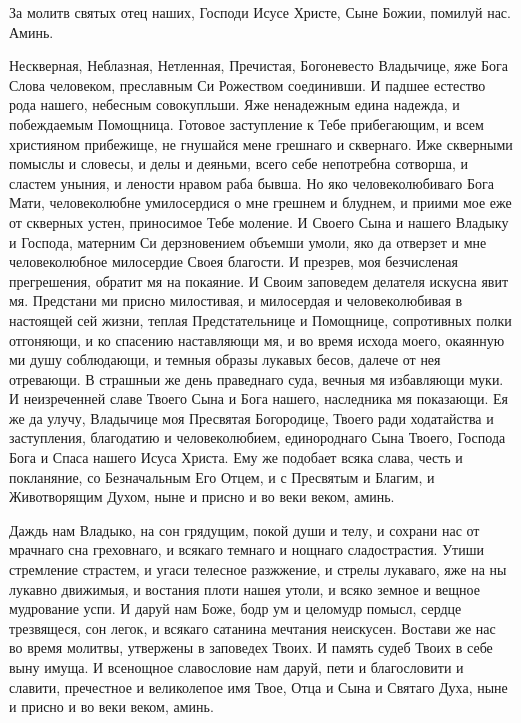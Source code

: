 \begin{mymulticols}
За молитв святых отец наших, Господи Исусе Христе, Сыне Божии, помилуй нас. Аминь.


 Нескверная, Неблазная, Нетленная, Пречистая, Богоневесто Владычице, яже Бога Слова человеком, преславным Си Рожеством соединивши. И падшее естество рода нашего, небесным совокупльши. Яже ненадежным едина надежда, и побеждаемым Помощница. Готовое заступление к Тебе прибегающим, и всем християном прибежище, не гнушайся мене грешнаго и сквернаго. Иже скверными помыслы и словесы, и делы и деяньми, всего себе непотребна сотворша, и сластем уныния, и лености нравом раба бывша. Но яко человеколюбиваго Бога Мати, человеколюбне умилосердися о мне грешнем и блуднем, и приими мое еже от скверных устен, приносимое Тебе моление. И Своего Сына и нашего Владыку и Господа, матерним Си дерзновением объемши умоли, яко да отверзет и мне человеколюбное милосердие Своея благости. И презрев, моя безчисленая прегрешения, обратит мя на покаяние. И Своим заповедем делателя искусна явит мя. Предстани ми присно милостивая, и милосердая и человеколюбивая в настоящей сей жизни, теплая Предстательнице и Помощнице, сопротивных полки отгоняющи, и ко спасению наставляющи мя, и во время исхода моего, окаянную ми душу соблюдающи, и темныя образы лукавых бесов, далече от нея отревающи. В страшныи же день праведнаго суда, вечныя мя избавляющи муки. И неизреченней славе Твоего Сына и Бога нашего, наследника мя показающи. Ея же да улучу, Владычице моя Пресвятая Богородице, Твоего ради ходатайства и заступления, благодатию и человеколюбием, единороднаго Сына Твоего, Господа Бога и Спаса нашего Исуса Христа. Ему же подобает всяка слава, честь и покланяние, со Безначальным Его Отцем, и с Пресвятым и Благим, и Животворящим Духом, ныне и присно и во веки веком, аминь.

 Даждь нам Владыко, на сон грядущим, покой души и телу, и сохрани нас от мрачнаго сна греховнаго, и всякаго темнаго и нощнаго сладострастия. Утиши стремление страстем, и угаси телесное разжжение, и стрелы лукаваго, яже на ны лукавно движимыя, и востания плоти нашея утоли, и всяко земное и вещное мудрование успи. И даруй нам Боже, бодр ум и целомудр помысл, сердце трезвящеся, сон легок, и всякаго сатанина мечтания неискусен. Востави же нас во время молитвы, утвержены в заповедех Твоих. И память судеб Твоих в себе выну имуща. И всенощное славословие нам даруй, пети и благословити и славити, пречестное и великолепое имя Твое, Отца и Сына и Святаго Духа, ныне и присно и во веки веком, аминь.


\end{mymulticols}
